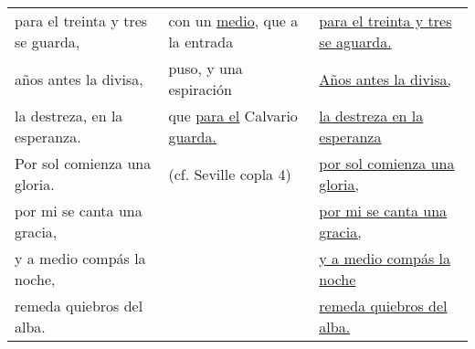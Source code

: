 \documentclass{tex/vcbook-float}
\begin{document}
\begin{tabular}{lll}
    para el treinta y tres se guarda,
    & con un \uline{medio}, que a la entrada &
    \uline{para el treinta y tres se aguarda.} \\

    años antes la divisa,
    & puso, y una espiración & 
    \strophe{} \uline{Años antes la divisa,} \\

    la destreza, en la esperanza.
    & que \uline{para el} Calvario \uline{guarda.} & 
    \uline{la destreza en la esperanza} \\

    \strophe{} Por sol comienza una gloria. & 
    (cf. Seville copla 4) & 
    \uline{por sol comienza una gloria,} \\

    por mi se canta una gracia, &
    &
    \uline{por mi se canta una gracia,} \\

    y a medio compás la noche, &
    &
    \uline{y a medio compás la noche} \\

    remeda quiebros del alba. &
    &
    \uline{remeda quiebros del alba.} \\
    \bottomrule
\end{tabular}
\end{document}

